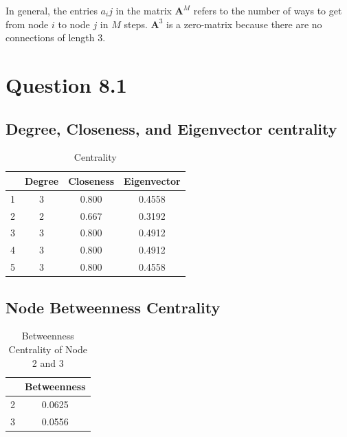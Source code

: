\documentclass[]{article}
\begin{document}
In general, the entries $a_ij$ in the matrix $\mathbf{A}^M$ refers to the number of ways to get from node $i$ to node $j$ in $M$ steps. $\mathbf{A}^3$ is a zero-matrix because there are no connections of length 3. 

\newpage

\section*{Question 8.1}

\subsection*{Degree, Closeness, and Eigenvector centrality}

\begin{table}[htbp]
	\centering
	\caption{Centrality}
	\begin{tabular}{|cccc|}
		\toprule
		\rowcolor[rgb]{ .267,  .447,  .769} \multicolumn{1}{|l}{\textcolor[rgb]{ 1,  1,  1}{\textbf{Nodes}}} & \multicolumn{1}{l}{\textcolor[rgb]{ 1,  1,  1}{\textbf{Degree}}} & \multicolumn{1}{l}{\textcolor[rgb]{ 1,  1,  1}{\textbf{Closeness}}} & \multicolumn{1}{l|}{\textcolor[rgb]{ 1,  1,  1}{\textbf{Eigenvector}}} \\
		\midrule
		1     & 3     & 0.800 & 0.4558 \\
		\midrule
		2     & 2     & 0.667 & 0.3192 \\
		\midrule
		3     & 3     & 0.800 & 0.4912 \\
		\midrule
		4     & 3     & 0.800 & 0.4912 \\
		\midrule
		5     & 3     & 0.800 & 0.4558 \\
		\bottomrule
	\end{tabular}
	\label{table:DCE_Centrality}
\end{table}

\subsection*{Node Betweenness Centrality}

\begin{table}[htbp]
	\centering
	\caption{Betweenness Centrality of Node 2 and 3}
	\begin{tabular}{|cc|}
		\toprule
		\rowcolor[rgb]{ .267,  .447,  .769} \multicolumn{1}{|l}{\textcolor[rgb]{ 1,  1,  1}{\textbf{Node}}} & \multicolumn{1}{l|}{\textcolor[rgb]{ 1,  1,  1}{\textbf{Betweenness}}} \\
		\midrule
		2     & 0.0625 \\
		\midrule
		3     & 0.0556 \\
		\bottomrule
	\end{tabular}
	\label{table:Betweenness_Centrality}
\end{table}
\end{document}
